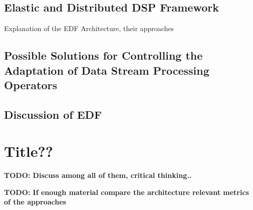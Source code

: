         \subsection{Elastic and Distributed DSP Framework}
        Explanation of the EDF Architecture, their approaches

        \subsection{Possible Solutions for Controlling the Adaptation of Data Stream Processing Operators}

        \subsection{Discussion of EDF}

    \section{Title??}
    \textbf{TODO: Discuss among all of them, critical thinking..}

    \textbf{TODO: If enough material compare the architecture relevant metrics of the approaches}